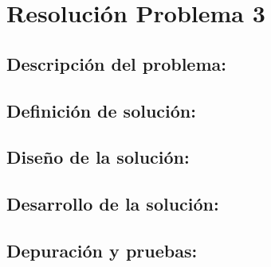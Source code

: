 \section{Resolución Problema 3}

\subsection{\textbf{Descripción del problema:}}

\subsection{\textbf{Definición de solución:}}

\subsection{\textbf{Diseño de la solución:}}

\subsection{\textbf{Desarrollo de la solución:}}

\subsection{\textbf{Depuración y pruebas:}}